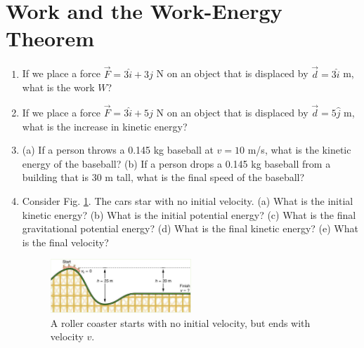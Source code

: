\documentclass[10pt]{article}
\begin{document}
\section{Work and the Work-Energy Theorem}
\begin{enumerate}
\item If we place a force $\vec{F} = 3 \hat{i} + 3\hat{j}$ N on an object that is displaced by $\vec{d} = 3\hat{i}$ m, what is the work $W$? \\ \vspace{0.75cm}
\item If we place a force $\vec{F} = 3 \hat{i} + 5\hat{j}$ N on an object that is displaced by $\vec{d} = 5\hat{j}$ m, what is the increase in kinetic energy? \\ \vspace{0.75cm}
\item (a) If a person throws a 0.145 kg baseball at $v=10$ m/s, what is the kinetic energy of the baseball?  (b) If a person drops a 0.145 kg baseball from a building that is 30 m tall, what is the final speed of the baseball? \\ \vspace{1cm}
\item Consider Fig. \ref{fig:coaster}.  The cars star with no initial velocity.  (a) What is the initial kinetic energy? (b) What is the initial potential energy? (c) What is the final gravitational potential energy? (d) What is the final kinetic energy? (e) What is the final velocity?
\begin{figure}[ht]
\centering
\includegraphics[width=0.5\textwidth]{figures/coaster.png}
\caption{\label{fig:coaster} A roller coaster starts with no initial velocity, but ends with velocity $v$.}
\end{figure}
\end{enumerate}
\end{document}

